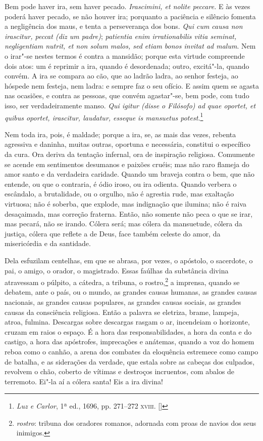 \begin{hedraquote}
Bem pode haver ira, sem haver pecado. \textit{Irascimini,
et nolite peccare.} E às vezes poderá haver pecado, se não houver ira;
porquanto a paciência e silêncio fomenta a negligência dos maus, e
tenta a perseverança dos bons. \textit{Qui cum causa non irascitur,
peccat (diz um padre)};\textit{ patientia enim irrationabilis vitia
seminat, negligentiam nutrit, et non solum malos, sed etiam bonos
invitat ad malum}. Nem o irar"-se nestes termos é
contra a mansidão; porque esta virtude compreende dois atos: um é
reprimir a ira, quando é desordenada; outro, excitá"-la, quando convém.
A ira se compara ao cão, que ao ladrão ladra, ao senhor festeja, ao
hóspede nem festeja, nem ladra: e sempre faz o seu ofício. E assim quem
se agasta nas ocasiões, e contra as pessoas, que convém agastar"-se, bem
pode, com tudo isso, ser verdadeiramente manso. \textit{Qui igitur
(disse o Filósofo) ad quae oportet, et quibus oportet, irascitur,
laudatur, esseque is mansuetus potest.}\footnote{
\textit{Luz e Carlor}, 1ª ed., 1696, pp. 271--272 \textsc{xviii}. []}
\end{hedraquote}


Nem toda ira, pois, é maldade; porque a ira, se, as mais das
vezes, rebenta agressiva e daninha, muitas outras, oportuna e
necessária, constitui o específico da cura. Ora deriva da tentação
infernal, ora de inspiração religiosa. Comumente se acende em
sentimentos desumanos e paixões cruéis; mas não raro flameja do amor
santo e da verdadeira caridade. Quando um braveja contra o bem, que não
entende, ou que o contraria, é ódio iroso, ou ira odienta. Quando
verbera o escândalo, a brutalidade, ou o orgulho, não é agrestia rude,
mas exaltação virtuosa; não é soberba, que explode, mas indignação que
ilumina; não é raiva desaçaimada, mas correção fraterna. Então, não
somente não peca o que se irar, mas pecará, não se irando. Cólera será;
mas cólera da mansuetude, cólera da justiça, cólera que reflete a de
Deus, face também celeste do amor, da misericórdia e da santidade.

Dela esfuzilam centelhas, em que se abrasa, por vezes, o apóstolo,
o sacerdote, o pai, o amigo, o orador, o magistrado. Essas faúlhas da
substância divina atravessam o púlpito, a cátedra, a tribuna, o
rostro,\footnote{\textit{rostro}: tribuna dos oradores romanos, adornada com proas de navios dos seus inimigos.} a imprensa, quando se debatem, ante
o país, ou o mundo, as grandes causas humanas, as grandes causas
nacionais, as grandes causas populares, as grandes causas sociais, as
grandes causas da consciência religiosa. Então a palavra se eletriza,
brame, lampeja, atroa, fulmina. Descargas sobre descargas rasgam o ar,
incendeiam o horizonte, cruzam em raios o espaço. É a hora das
responsabilidades, a hora da conta e do castigo, a hora das apóstrofes,
imprecações e anátemas, quando a voz do homem reboa como o canhão, a
arena dos combates da eloquência estremece como campo de batalha, e as
siderações da verdade, que estala sobre as cabeças dos culpados,
revolvem o chão, coberto de vítimas e destroços incruentos, com abalos
de terremoto. Ei"-la aí a cólera santa! Eis a ira divina!


